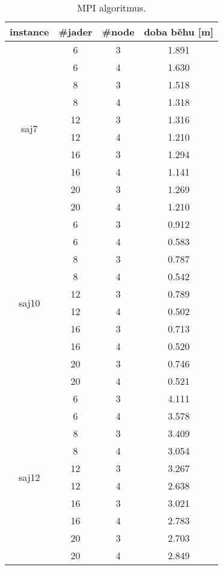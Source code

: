 \documentclass{article}
\begin{document}
    \begin{table}[h]
        \centering
        \begin{tabular}{|c|c|c|c|}
            \hline
            \textbf{instance} & \textbf{\#jader} & \textbf{\#node} & \multicolumn{1}{c|}{\textbf{doba běhu} {[}m{]}} \\ \hline
            \multirow{10}{*}{saj7}  & 6  & 3 & 1.891 \\
            & 6  & 4 & 1.630 \\
            & 8  & 3 & 1.518 \\
            & 8  & 4 & 1.318 \\
            & 12 & 3 & 1.316 \\
            & 12 & 4 & 1.210 \\
            & 16 & 3 & 1.294 \\
            & 16 & 4 & 1.141 \\
            & 20 & 3 & 1.269 \\
            & 20 & 4 & 1.210 \\ \hline
            \multirow{10}{*}{saj10} & 6  & 3 & 0.912 \\
            & 6  & 4 & 0.583 \\
            & 8  & 3 & 0.787 \\
            & 8  & 4 & 0.542 \\
            & 12 & 3 & 0.789 \\
            & 12 & 4 & 0.502 \\
            & 16 & 3 & 0.713 \\
            & 16 & 4 & 0.520 \\
            & 20 & 3 & 0.746 \\
            & 20 & 4 & 0.521 \\ \hline
            \multirow{10}{*}{saj12} & 6  & 3 & 4.111 \\
            & 6  & 4 & 3.578 \\
            & 8  & 3 & 3.409 \\
            & 8  & 4 & 3.054 \\
            & 12 & 3 & 3.267 \\
            & 12 & 4 & 2.638 \\
            & 16 & 3 & 3.021 \\
            & 16 & 4 & 2.783 \\
            & 20 & 3 & 2.703 \\
            & 20 & 4 & 2.849 \\ \hline
        \end{tabular}
        \caption{MPI algoritmus.}
        \label{tab:mpi}
    \end{table}
\end{document}
